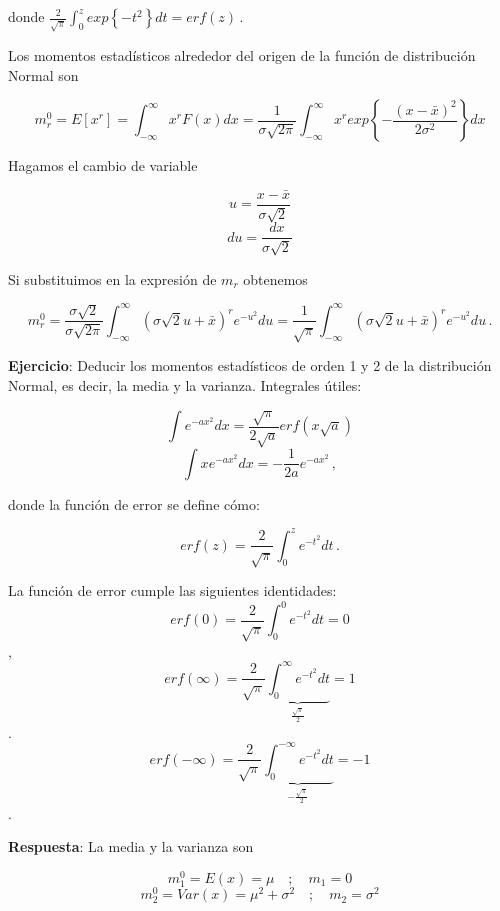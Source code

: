 \documentclass[
]{agujournal2019}
\begin{document}
donde
\(\frac{2}{\sqrt{\pi}}\int^z_{0}{exp}\left\{ -t^2 \right\}dt={erf}(z)\,.\)

\begin{center}
\end{center}

Los momentos estadísticos alrededor del origen de la función de
distribución Normal son

\[m^0_r=E[x^r]=\int^{\infty}_{-\infty} x^rF(x)dx=\frac{1}{\sigma\sqrt{2\pi}}\int^{\infty}_{-\infty}x^r{exp}
   \left\{ -\frac{(x-\bar{x})^2}{2\sigma^2} \right\} dx\]

Hagamos el cambio de variable

\[u=\frac{x-\bar{x}}{\sigma\sqrt{2}}\] \[du=\frac{dx}{\sigma\sqrt{2}}\]

Si substituimos en la expresión de \(m_r\) obtenemos

\[m^0_r=\frac{\sigma\sqrt{2}}{\sigma\sqrt{2\pi}}\int^{\infty}_{-\infty}
  \left( \sigma \sqrt{2}u+\bar{x}\right)^r{e}^{-u^2}du=
  \frac{1}{\sqrt{\pi}}\int^{\infty}_{-\infty}\left( \sigma \sqrt{2}u+\bar{x}\right)^r{e}
   ^{-u^2}du\,.\]

\vspace{0.25cm}

\textbf{Ejercicio}: Deducir los momentos estadísticos de orden 1 y 2 de
la distribución Normal, es decir, la media y la varianza. Integrales
útiles:

\[\int e^{-ax^2}dx=\frac{\sqrt{\pi}}{2\sqrt{a}}{erf}(x\sqrt{a})\]
\[\int xe^{-ax^2}dx=-\frac{1}{2a}e^{-ax^2}\,,\]

donde la función de error se define cómo:

\[erf(z)=\frac{2}{\sqrt{\pi}}\int_0^z e^{-t^2} dt\,.\]

La función de error cumple las siguientes identidades:
\[{erf}(0)=\frac{2}{\sqrt{\pi}}\int_0^0 e^{-t^2} dt=0\],
\[{erf}(\infty)=\frac{2}{\sqrt{\pi}}\underbrace{\int_0^\infty e^{-t^2} dt}_{\frac{\sqrt{\pi}}{2}}=1\].
\[{erf}(-\infty)=\frac{2}{\sqrt{\pi}}\underbrace{\int_0^{-\infty} e^{-t^2} dt}_{-\frac{\sqrt{\pi}}{2}}=-1\].

\vspace{0.25cm}

\textbf{Respuesta}: La media y la varianza son

\[m^0_1=E(x)=\mu\,\,\,\,\,\,;\,\,\,\,\,\,m_1=0\]
\[m^0_2=Var(x)=\mu^2 + \sigma^2\,\,\,\,\,\,;\,\,\,\,\,\,m_2=\sigma^2\]

\vspace{0.25cm}
\end{document}
